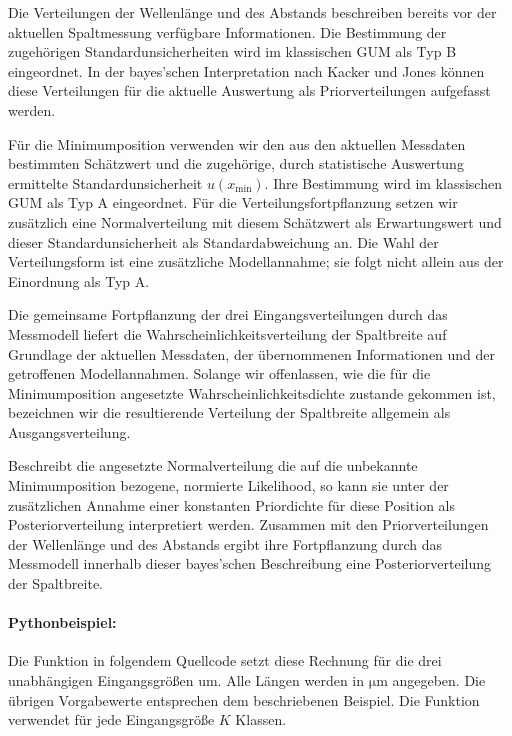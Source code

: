 Die Verteilungen der Wellenlänge und des Abstands beschreiben bereits vor der aktuellen Spaltmessung verfügbare Informationen. Die Bestimmung der zugehörigen Standardunsicherheiten wird im klassischen GUM als Typ B eingeordnet. In der bayes'schen Interpretation nach Kacker und Jones \cite{Kac03} können diese Verteilungen für die aktuelle Auswertung als Priorverteilungen aufgefasst werden.

Für die Minimumposition verwenden wir den aus den aktuellen Messdaten bestimmten Schätzwert und die zugehörige, durch statistische Auswertung ermittelte Standardunsicherheit $u(x_{\mathrm{min}})$. Ihre Bestimmung wird im klassischen GUM als Typ A eingeordnet. Für die Verteilungsfortpflanzung setzen wir zusätzlich eine Normalverteilung mit diesem Schätzwert als Erwartungswert und dieser Standardunsicherheit als Standardabweichung an. Die Wahl der Verteilungsform ist eine zusätzliche Modellannahme; sie folgt nicht allein aus der Einordnung als Typ A.

Die gemeinsame Fortpflanzung der drei Eingangsverteilungen durch das Messmodell liefert die Wahrscheinlichkeitsverteilung der Spaltbreite auf Grundlage der aktuellen Messdaten, der übernommenen Informationen und der getroffenen Modellannahmen. Solange wir offenlassen, wie die für die Minimumposition angesetzte Wahrscheinlichkeitsdichte zustande gekommen ist, bezeichnen wir die resultierende Verteilung der Spaltbreite allgemein als Ausgangsverteilung.

Beschreibt die angesetzte Normalverteilung die auf die unbekannte Minimumposition bezogene, normierte Likelihood, so kann sie unter der zusätzlichen Annahme einer konstanten Priordichte für diese Position als Posteriorverteilung interpretiert werden. Zusammen mit den Priorverteilungen der Wellenlänge und des Abstands ergibt ihre Fortpflanzung durch das Messmodell innerhalb dieser bayes'schen Beschreibung eine Posteriorverteilung der Spaltbreite.

\paragraph{Pythonbeispiel:}

Die Funktion in folgendem Quellcode setzt diese Rechnung für die drei unabhängigen
Eingangsgrößen um. Alle Längen werden in $\mathrm{\mu m}$ angegeben.
Die übrigen Vorgabewerte entsprechen dem beschriebenen Beispiel.
Die Funktion verwendet für jede Eingangsgröße $K$ Klassen.

